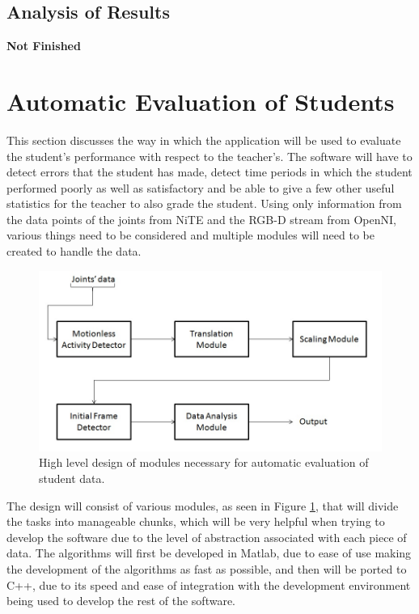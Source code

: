 \documentclass[10pt]{article}
\begin{document}
\subsection{Analysis of Results}
\textbf{Not Finished}
\clearpage

\section{Automatic Evaluation of Students}
\noindent
This section discusses the way in which the application will be used to evaluate the student's performance with respect to the teacher's. The software will have to detect errors that the student has made, detect time periods in which the student performed poorly as well as satisfactory and be able to give a few other useful statistics for the teacher to also grade the student. Using only information from the data points of the joints from NiTE and the RGB-D stream from OpenNI, various things need to be considered and multiple modules will need to be created to handle the data. 

\begin{figure}[H]
\centering
\includegraphics[scale=0.4]{data_analysis_modules.jpg}
\caption{High level design of modules necessary for automatic evaluation of student data.}
\label{modules}
\end{figure}
 
\noindent The design will consist of various modules, as seen in Figure \ref{modules}, that will divide the tasks into manageable chunks, which will be very helpful when trying to develop the software due to the level of abstraction associated with each piece of data. The algorithms will first be developed in Matlab, due to ease of use making the development of the algorithms as fast as possible, and then will be ported to C++, due to its speed and ease of integration with the development environment being used to develop the rest of the software. 
\end{document}
